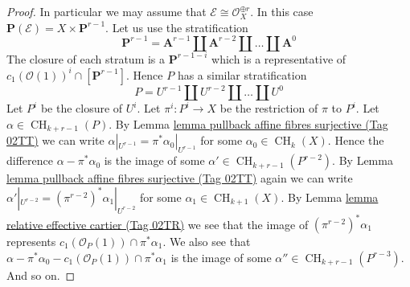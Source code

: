 \documentclass{amsart}
\theoremstyle{plain}
\theoremstyle{definition}
\theoremstyle{remark}
\numberwithin{equation}{subsection}
\def\CH{\mathop{\mathrm{CH}}\nolimits}
\begin{document}
\begin{proof}
\medskip\noindent
In particular we may assume that $\mathcal{E} \cong \mathcal{O}_X^{\oplus r}$.
In this case $\mathbf{P}(\mathcal{E}) = X \times \mathbf{P}^{r - 1}$.
Let us use the stratification
$$
\mathbf{P}^{r - 1} = \mathbf{A}^{r - 1}
\amalg \mathbf{A}^{r - 2}
\amalg \ldots
\amalg \mathbf{A}^0
$$
The closure of each stratum is a $\mathbf{P}^{r - 1 - i}$ which is a
representative of $c_1(\mathcal{O}(1))^i \cap [\mathbf{P}^{r - 1}]$.
Hence $P$ has a similar stratification
$$
P = U^{r - 1} \amalg U^{r - 2} \amalg \ldots \amalg U^0
$$
Let $P^i$ be the closure of $U^i$. Let $\pi^i : P^i \to X$
be the restriction of $\pi$ to $P^i$.
Let $\alpha \in \CH_{k + r - 1}(P)$. By
Lemma \href{https://stacks.math.columbia.edu/tag/02TT}{lemma pullback affine fibres surjective (Tag 02TT)}
we can write $\alpha|_{U^{r - 1}} = \pi^*\alpha_0|_{U^{r - 1}}$
for some $\alpha_0 \in \CH_k(X)$. Hence the difference
$\alpha - \pi^*\alpha_0$ is the image of some
$\alpha' \in \CH_{k + r - 1}(P^{r - 2})$.
By Lemma \href{https://stacks.math.columbia.edu/tag/02TT}{lemma pullback affine fibres surjective (Tag 02TT)}
again we can write
$\alpha'|_{U^{r - 2}} = (\pi^{r - 2})^*\alpha_1|_{U^{r - 2}}$
for some $\alpha_1 \in \CH_{k + 1}(X)$.
By Lemma \href{https://stacks.math.columbia.edu/tag/02TR}{lemma relative effective cartier (Tag 02TR)}
we see that the image of $(\pi^{r - 2})^*\alpha_1$
represents $c_1(\mathcal{O}_P(1)) \cap \pi^*\alpha_1$.
We also see that
$\alpha - \pi^*\alpha_0 - c_1(\mathcal{O}_P(1)) \cap \pi^*\alpha_1$
is the image of some $\alpha'' \in \CH_{k + r - 1}(P^{r - 3})$.
And so on.
\end{proof}
\end{document}
